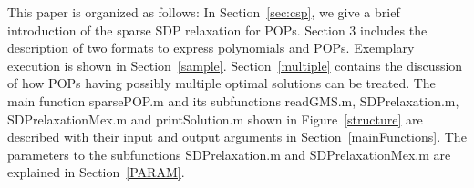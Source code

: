 This paper is organized as follows:
In Section~\ref{sec:csp}, we give a brief introduction of the 
sparse SDP relaxation %
\cite{WAKI04} for POPs. Section 3 includes the description of 
two formats to express polynomials and POPs. %
Exemplary execution is shown in Section~\ref{sample}. %
Section~\ref{multiple} contains the discussion of
how  POPs having possibly  multiple optimal solutions can be treated. 
The main  function 
sparsePOP.m and its  subfunctions readGMS.m, SDPrelaxation.m, SDPrelaxationMex.m 
and printSolution.m shown in Figure~\ref{structure} are described with their
input and output arguments in Section~\ref{mainFunctions}. 
The parameters %
to the subfunctions SDPrelaxation.m and SDPrelaxationMex.m
are explained in Section~\ref{PARAM}.
